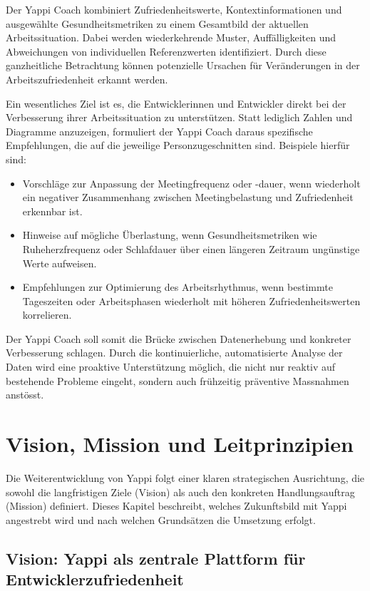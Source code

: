 \documentclass[12pt,a4paper]{report}
\begin{document}
Der Yappi Coach kombiniert Zufriedenheitswerte, Kontextinformationen und ausgewählte Gesundheitsmetriken zu einem Gesamtbild der
aktuellen Arbeitssituation. Dabei werden wiederkehrende Muster, Auffälligkeiten und Abweichungen von individuellen Referenzwerten
identifiziert. Durch diese ganzheitliche Betrachtung können potenzielle Ursachen für Veränderungen in der Arbeitszufriedenheit
erkannt werden.

Ein wesentliches Ziel ist es, die Entwicklerinnen und Entwickler direkt bei der Verbesserung ihrer Arbeitssituation zu 
unterstützen. Statt lediglich Zahlen und Diagramme anzuzeigen, formuliert der Yappi Coach daraus spezifische Empfehlungen, die 
auf die jeweilige Personzugeschnitten sind. Beispiele hierfür sind:

\begin{itemize}
    \item Vorschläge zur Anpassung der Meetingfrequenz oder -dauer, wenn wiederholt ein negativer Zusammenhang zwischen
      Meetingbelastung und Zufriedenheit erkennbar ist.
    \item Hinweise auf mögliche Überlastung, wenn Gesundheitsmetriken wie Ruheherzfrequenz oder Schlafdauer über einen längeren
      Zeitraum ungünstige Werte aufweisen.
    \item Empfehlungen zur Optimierung des Arbeitsrhythmus, wenn bestimmte Tageszeiten oder Arbeitsphasen wiederholt mit höheren
      Zufriedenheitswerten korrelieren.
\end{itemize}

Der Yappi Coach soll somit die Brücke zwischen Datenerhebung und konkreter Verbesserung schlagen. Durch die kontinuierliche, 
automatisierte Analyse der Daten wird eine proaktive Unterstützung möglich, die nicht nur reaktiv auf bestehende Probleme eingeht,
sondern auch frühzeitig präventive Massnahmen anstösst.

\section{Vision, Mission und Leitprinzipien}

Die Weiterentwicklung von Yappi folgt einer klaren strategischen Ausrichtung, die sowohl die langfristigen Ziele (Vision) als auch 
den konkreten Handlungsauftrag (Mission) definiert. Dieses Kapitel beschreibt, welches Zukunftsbild mit Yappi angestrebt wird und
nach welchen Grundsätzen die Umsetzung erfolgt.

\subsection{Vision: Yappi als zentrale Plattform für Entwicklerzufriedenheit}
\end{document}
